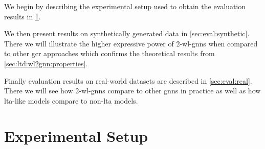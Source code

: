 \begin{enumerate*}[label={\circled{\small\arabic*}}]
	\item We begin by describing the experimental setup used to obtain the evaluation results in \cref{sec:eval:setup}.
	\item We then present results on synthetically generated data in \cref{sec:eval:synthetic}.
	 	There we will illustrate the higher expressive power of 2-\acs{wl}-\acsp{gnn} when compared to other \ac{gcr} approaches which confirms the theoretical results from \cref{sec:ltd:wl2gnn:properties}.
	\item Finally evaluation results on real-world datasets are described in \cref{sec:eval:real}.
		There we will see how 2-\acs{wl}-\acsp{gnn} compare to other \acp{gnn} in practice as well as how \acs{lta}-like models compare to non-\acs{lta} models.
\end{enumerate*}

\section{Experimental Setup}%
\label{sec:eval:setup}

